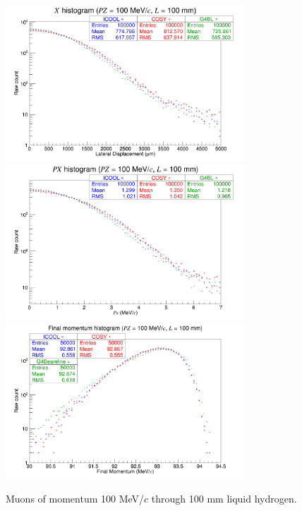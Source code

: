 \begin{figure}[!htb]
  \centering
    \includegraphics[width=0.8\textwidth]{Validation/LH/X.100.100.png} 
    \includegraphics[width=0.8\textwidth]{Validation/LH/PX.100.100.png} 
    \includegraphics[width=0.8\textwidth]{Validation/LH/strag.100.100.png} 
  \caption{Muons of momentum 100 MeV/$c$ through 100 mm liquid hydrogen.}
  \label{fig:100.100}
\end{figure}

